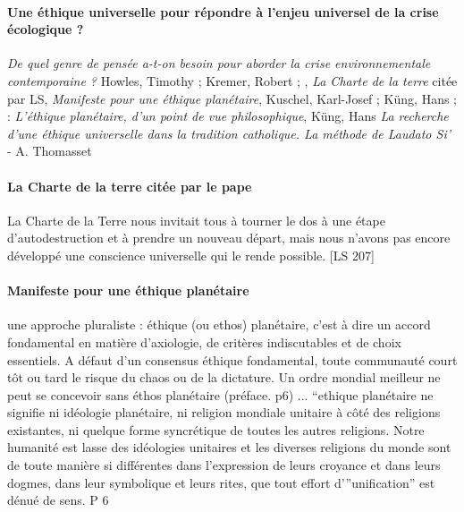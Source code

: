 \paragraph{Une éthique universelle pour répondre à l'enjeu universel de la crise écologique ?} \textit{De quel genre de pensée a-t-on besoin pour aborder la crise environnementale contemporaine ?} Howles, Timothy ; Kremer, Robert \cite{howles_quel_2022};  \cite{thomasset_recherche_2019}, \textit{La Charte de la terre} citée par LS, \textit{Manifeste pour une éthique planétaire}, Kuschel, Karl-Josef ; Küng, Hans ; \cite{kuschel_manifeste_1995} : \textit{L’éthique planétaire, d’un point de vue philosophique}, Küng, Hans \cite{kung_lethique_2009} \textit{La recherche d’une éthique universelle dans la tradition catholique. La méthode de Laudato Si’ }- A. Thomasset 



\paragraph{La Charte de la terre citée par le pape}


\begin{singlequote}
  La Charte de la Terre nous invitait tous à tourner le dos à une étape d’autodestruction et à prendre un nouveau départ, mais nous n’avons pas encore développé une conscience universelle qui le rende possible. [LS 207]
\end{singlequote}



\paragraph{Manifeste pour une éthique planétaire} \cite{kuschel_manifeste_1995} 
 
\begin{singlequote}
    une approche pluraliste :
éthique (ou ethos) planétaire, c’est à dire un accord fondamental en matière d’axiologie, de critères indiscutables et de choix essentiels. A défaut d’un consensus éthique fondamental, toute communauté court tôt ou tard le risque du chaos ou de la dictature.  Un ordre mondial meilleur ne peut se concevoir sans éthos planétaire  \cite{kuschel_manifeste_1995}
(préface. p6) 
{...}
“ethique planétaire ne signifie ni idéologie planétaire, ni religion mondiale unitaire à côté des religions existantes, ni quelque forme syncrétique de toutes les autres religions. Notre humanité est lasse des idéologies unitaires et les diverses religions du monde sont de toute manière si différentes dans l’expression de leurs croyance et dans leurs dogmes, dans leur symbolique et leurs rites, que tout effort d’”unification” est dénué de sens. P 6
\end{singlequote}


